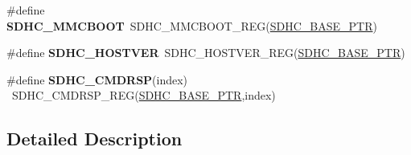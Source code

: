 \begin{DoxyCompactItemize}
\item 
\hypertarget{group___s_d_h_c___register___accessor___macros_gab4dff4aeb9392aabdb6f9e6dcf136428}{}\#define {\bfseries S\+D\+H\+C\+\_\+\+M\+M\+C\+B\+O\+O\+T}~S\+D\+H\+C\+\_\+\+M\+M\+C\+B\+O\+O\+T\+\_\+\+R\+E\+G(\hyperlink{group___s_d_h_c___peripheral_gaf6d94732d48040eef799143f86be859c}{S\+D\+H\+C\+\_\+\+B\+A\+S\+E\+\_\+\+P\+T\+R})\label{group___s_d_h_c___register___accessor___macros_gab4dff4aeb9392aabdb6f9e6dcf136428}

\item 
\hypertarget{group___s_d_h_c___register___accessor___macros_ga8a0985af9c573c7c102c0e8d61d525ad}{}\#define {\bfseries S\+D\+H\+C\+\_\+\+H\+O\+S\+T\+V\+E\+R}~S\+D\+H\+C\+\_\+\+H\+O\+S\+T\+V\+E\+R\+\_\+\+R\+E\+G(\hyperlink{group___s_d_h_c___peripheral_gaf6d94732d48040eef799143f86be859c}{S\+D\+H\+C\+\_\+\+B\+A\+S\+E\+\_\+\+P\+T\+R})\label{group___s_d_h_c___register___accessor___macros_ga8a0985af9c573c7c102c0e8d61d525ad}

\item 
\hypertarget{group___s_d_h_c___register___accessor___macros_gaae9bcd896aa4cfecd4790e6ce949f3e3}{}\#define {\bfseries S\+D\+H\+C\+\_\+\+C\+M\+D\+R\+S\+P}(index)                                          ~S\+D\+H\+C\+\_\+\+C\+M\+D\+R\+S\+P\+\_\+\+R\+E\+G(\hyperlink{group___s_d_h_c___peripheral_gaf6d94732d48040eef799143f86be859c}{S\+D\+H\+C\+\_\+\+B\+A\+S\+E\+\_\+\+P\+T\+R},index)\label{group___s_d_h_c___register___accessor___macros_gaae9bcd896aa4cfecd4790e6ce949f3e3}

\end{DoxyCompactItemize}


\subsection{Detailed Description}
